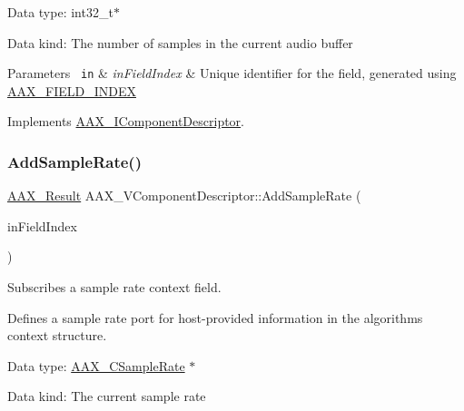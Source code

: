 \begin{DoxyItemize}
\item Data type\+: int32\+\_\+t$\ast$
\item Data kind\+: The number of samples in the current audio buffer
\end{DoxyItemize}


\begin{DoxyParams}[1]{Parameters}
\mbox{\texttt{ in}}  & {\em in\+Field\+Index} & Unique identifier for the field, generated using \mbox{\hyperlink{a00392_acf807247ecd6e5899dc9dc31644e9a1d}{A\+A\+X\+\_\+\+F\+I\+E\+L\+D\+\_\+\+I\+N\+D\+EX}} \\
\hline
\end{DoxyParams}


Implements \mbox{\hyperlink{a01781_a55d6cdb4a9c860c9ed4cb685e346f0dc}{A\+A\+X\+\_\+\+I\+Component\+Descriptor}}.

\mbox{\label{a01901_a7c69cb309caba10c00e43df147697e98}} 
\subsubsection{\texorpdfstring{AddSampleRate()}{AddSampleRate()}}
{\footnotesize\ttfamily \mbox{\hyperlink{a00392_a4d8f69a697df7f70c3a8e9b8ee130d2f}{A\+A\+X\+\_\+\+Result}} A\+A\+X\+\_\+\+V\+Component\+Descriptor\+::\+Add\+Sample\+Rate (\begin{DoxyParamCaption}\item[{\mbox{\hyperlink{a00392_ae807f8986143820cfb5d6da32165c9c7}{A\+A\+X\+\_\+\+C\+Field\+Index}}}]{in\+Field\+Index }\end{DoxyParamCaption})\hspace{0.3cm}{\ttfamily [virtual]}}



Subscribes a sample rate context field. 

Defines a sample rate port for host-\/provided information in the algorithm\textquotesingle{}s context structure.


\begin{DoxyItemize}
\item Data type\+: \mbox{\hyperlink{a00392_a3d9eea08f47e0b0a23432e15baa4e885}{A\+A\+X\+\_\+\+C\+Sample\+Rate}} $\ast$
\item Data kind\+: The current sample rate
\end{DoxyItemize}


